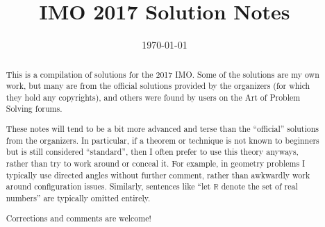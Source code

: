 \documentclass[11pt]{scrartcl}
\title{IMO 2017 Solution Notes}
\date{\today}
\begin{document}
\maketitle

\begin{abstract}
This is a compilation of solutions
for the 2017 IMO.
Some of the solutions are my own work,
but many are from the official solutions provided by the organizers
(for which they hold any copyrights),
and others were found by users on the Art of Problem Solving forums.

These notes will tend to be a bit more advanced and terse than the ``official''
solutions from the organizers.
In particular, if a theorem or technique is not known to beginners
but is still considered ``standard'', then I often prefer to
use this theory anyways, rather than try to work around or conceal it.
For example, in geometry problems I typically use directed angles
without further comment, rather than awkwardly work around configuration issues.
Similarly, sentences like ``let $\mathbb{R}$ denote the set of real numbers''
are typically omitted entirely.

Corrections and comments are welcome!
\end{abstract}

\tableofcontents
\newpage

\addtocounter{section}{-1}
\end{document}

